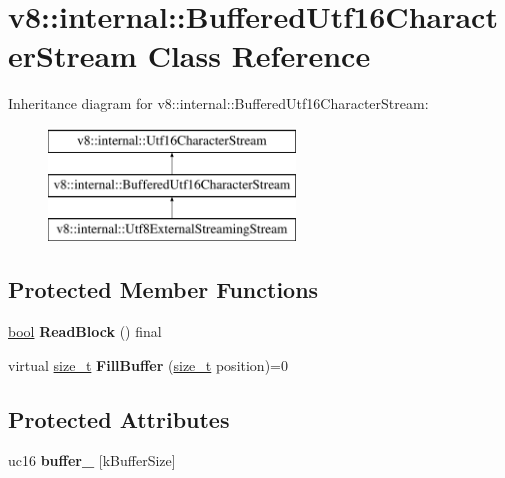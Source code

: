 \hypertarget{classv8_1_1internal_1_1BufferedUtf16CharacterStream}{}\section{v8\+:\+:internal\+:\+:Buffered\+Utf16\+Character\+Stream Class Reference}
\label{classv8_1_1internal_1_1BufferedUtf16CharacterStream}
Inheritance diagram for v8\+:\+:internal\+:\+:Buffered\+Utf16\+Character\+Stream\+:\begin{figure}[H]
\begin{center}
\leavevmode
\includegraphics[height=3.000000cm]{classv8_1_1internal_1_1BufferedUtf16CharacterStream}
\end{center}
\end{figure}
\subsection*{Protected Member Functions}
\begin{DoxyCompactItemize}
\item 
\mbox{\label{classv8_1_1internal_1_1BufferedUtf16CharacterStream_a9ffe932b7497a4e401fdc2c0452177bd}} 
\mbox{\hyperlink{classbool}{bool}} {\bfseries Read\+Block} () final
\item 
\mbox{\label{classv8_1_1internal_1_1BufferedUtf16CharacterStream_a7a69db23efd0133771057119e0a2a653}} 
virtual \mbox{\hyperlink{classsize__t}{size\+\_\+t}} {\bfseries Fill\+Buffer} (\mbox{\hyperlink{classsize__t}{size\+\_\+t}} position)=0
\end{DoxyCompactItemize}
\subsection*{Protected Attributes}
\begin{DoxyCompactItemize}
\item 
\mbox{\label{classv8_1_1internal_1_1BufferedUtf16CharacterStream_a05943ea5a34bca700e4e8ce7308c7b55}} 
uc16 {\bfseries buffer\+\_\+} \mbox{[}k\+Buffer\+Size\mbox{]}
\end{DoxyCompactItemize}

